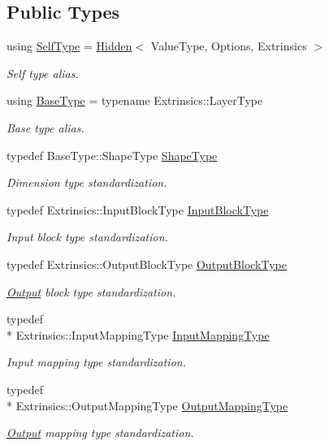 \subsection*{Public Types}
\begin{DoxyCompactItemize}
\item 
using \hyperlink{classffnn_1_1layer_1_1_hidden_a27c65759b388a6312329cf610d4fa4a3}{Self\-Type} = \hyperlink{classffnn_1_1layer_1_1_hidden}{Hidden}$<$ Value\-Type, Options, Extrinsics $>$
\begin{DoxyCompactList}\small\item\em Self type alias. \end{DoxyCompactList}\item 
using \hyperlink{classffnn_1_1layer_1_1_hidden_af146958f4a1b59faba4ae2b2eb521faf}{Base\-Type} = typename Extrinsics\-::\-Layer\-Type
\begin{DoxyCompactList}\small\item\em Base type alias. \end{DoxyCompactList}\item 
typedef Base\-Type\-::\-Shape\-Type \hyperlink{classffnn_1_1layer_1_1_hidden_a567e902299b3355501393cf6c7b27c38}{Shape\-Type}
\begin{DoxyCompactList}\small\item\em Dimension type standardization. \end{DoxyCompactList}\item 
typedef Extrinsics\-::\-Input\-Block\-Type \hyperlink{classffnn_1_1layer_1_1_hidden_abd5a3b5c55984948f903fe88759efaf4}{Input\-Block\-Type}
\begin{DoxyCompactList}\small\item\em Input block type standardization. \end{DoxyCompactList}\item 
typedef Extrinsics\-::\-Output\-Block\-Type \hyperlink{classffnn_1_1layer_1_1_hidden_a9fd326932b57e1d86d86bdb168822727}{Output\-Block\-Type}
\begin{DoxyCompactList}\small\item\em \hyperlink{classffnn_1_1layer_1_1_output}{Output} block type standardization. \end{DoxyCompactList}\item 
typedef \\*
Extrinsics\-::\-Input\-Mapping\-Type \hyperlink{classffnn_1_1layer_1_1_hidden_ac518f2e2be1250c1af7b2f8574cadc8d}{Input\-Mapping\-Type}
\begin{DoxyCompactList}\small\item\em Input mapping type standardization. \end{DoxyCompactList}\item 
typedef \\*
Extrinsics\-::\-Output\-Mapping\-Type \hyperlink{classffnn_1_1layer_1_1_hidden_a9d882e035c7cd80ccd9b58fbe832591e}{Output\-Mapping\-Type}
\begin{DoxyCompactList}\small\item\em \hyperlink{classffnn_1_1layer_1_1_output}{Output} mapping type standardization. \end{DoxyCompactList}\end{DoxyCompactItemize}
